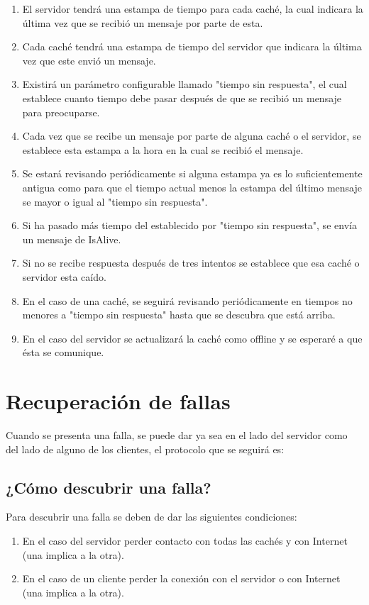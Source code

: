 \begin{enumerate}
\item El servidor tendrá una estampa de tiempo para cada caché, la cual indicara la última vez que se recibió un mensaje por parte de esta.
\item Cada caché tendrá una estampa de tiempo del servidor que indicara la última vez que este envió un mensaje.
\item Existirá un parámetro configurable llamado "tiempo sin respuesta", el cual establece cuanto tiempo debe pasar después de que se recibió un mensaje para preocuparse.
\item Cada vez que se recibe un mensaje por parte de alguna caché o el servidor, se establece esta estampa a la hora en la cual se recibió el mensaje.
\item Se estará revisando periódicamente si alguna estampa ya es lo suficientemente antigua como para que el tiempo actual menos la estampa del último mensaje se mayor o igual al "tiempo sin respuesta".
\item Si ha pasado más tiempo del establecido por "tiempo sin respuesta", se envía un mensaje de IsAlive.
\item Si no se recibe respuesta después de tres intentos se establece que esa caché o servidor esta caído.
\item En el caso de una caché, se seguirá revisando periódicamente en tiempos no menores a "tiempo sin respuesta" hasta que se descubra que está arriba.
\item En el caso del servidor se actualizará la caché como offline y se esperaré a que ésta se comunique.
\end{enumerate}

\section{Recuperación de fallas}
Cuando se presenta una falla, se puede dar ya sea en el lado del servidor como del lado de alguno de los clientes, el protocolo que se seguirá es:

\subsection{¿Cómo descubrir una falla?}
Para descubrir una falla se deben de dar las siguientes condiciones:
\begin{enumerate}
\item En el caso del servidor perder contacto con todas las cachés y con Internet (una implica a la otra).
\item En el caso de un cliente perder la conexión con el servidor o con Internet (una implica a la otra). 
\end{enumerate}

